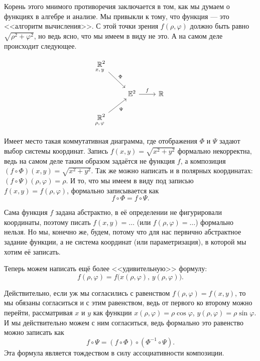 
Корень этого мнимого противоречия заключается в том, как мы думаем о функциях в алгебре и анализе. Мы привыкли к тому, что функция --- это <<алгоритм вычисления>>. С этой точки зрения $f(\rho, \varphi)$ должно быть равно $\sqrt{\rho^2 + \varphi^2}$, но ведь ясно, что мы имеем в виду не это. А на самом деле происходит следующее.

%
\[\begin{tikzcd}
	{\underset{\mathclap{x,\,y}}{\mathbb{R}}^2} \\
	& {\mathbb{E}^2} & {\mathbb{R}} \\
	{\underset{\mathclap{\rho,\,\varphi}}{\mathbb{R}}^2}
	\arrow["\Phi", from=1-1, to=2-2]
	\arrow["f", from=2-2, to=2-3]
	\arrow["\Psi"', from=3-1, to=2-2]
\end{tikzcd}\]
%

Имеет место такая коммутативная диаграмма, где отображения $\Phi$ и $\Psi$ задают выбор системы координат. Запись $f(x, y) = \sqrt{x^2 + y^2}$ формально некорректна, ведь на самом деле таким образом задаётся не функция $f$, а композиция $(f \circ \Phi)(x, y) = \sqrt{x^2 + y^2}$. Так же можно написать и в полярных координатах: $(f \circ \Psi)(\rho, \varphi) = \rho$. И то, что мы имеем в виду под записью $f(x, y) = f(\rho, \varphi)$, формально записывается как
\[
	f \circ \Phi = f \circ \Psi.
\]

Сама функция $f$ задана абстрактно, в её определении не фигурировали координаты, поэтому писать $f(x, y) = \ldots$ (или $f(\rho, \varphi) = \ldots$) формально нельзя. Но мы, конечно же, будем, потому что для нас первично абстрактное задание функции, а не система координат (или параметризация), в которой мы хотим её записать.

Теперь можем написать ещё более <<удивительную>> формулу:
\[
	f(\rho, \varphi) = f\big(x(\rho, \varphi),\,y(\rho, \varphi)\big).
\]

Действительно, если уж мы согласились с равенством $f(\rho, \varphi) = f(x, y)$, то мы обязаны согласиться и с этим равенством, ведь от первого ко второму можно перейти, рассматривая $x$ и $y$ как функции $x(\rho, \varphi) = \rho\cos\varphi$, $y(\rho, \varphi) = \rho\sin\varphi$. И мы действительно можем с ним согласиться, ведь формально это равенство можно записать как
\[
	f \circ \Psi = (f \circ \Phi) \circ (\Phi^{-1} \circ \Psi).
\]
Эта формула является тождеством в силу ассоциативности композиции.

